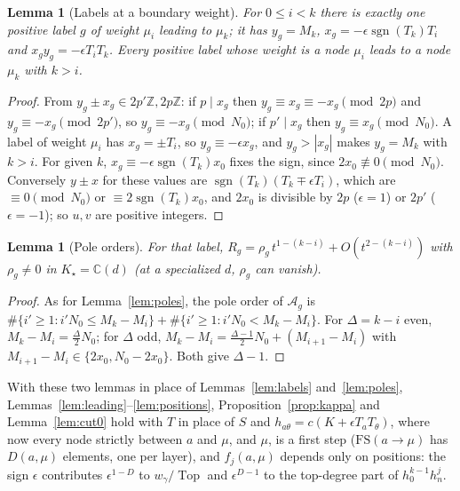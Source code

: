 \documentclass[11pt]{article}
\newtheorem{lemma}[theorem]{Lemma}
\theoremstyle{remark}
\begin{document}
\begin{lemma}[Labels at a boundary weight]\label{lem:blabels}
For $0\le i<k$ there is exactly one positive label $g$ of weight $\mu_i$
leading to $\mu_k$; it has $y_g=M_k$, $x_g=-\epsilon\operatorname{sgn}(T_k)T_i$
and $x_gy_g=-\epsilon T_iT_k$.  Every positive label whose weight is a node
$\mu_i$ leads to a node $\mu_k$ with $k>i$.
\end{lemma}

\begin{proof}
From $y_g\pm x_g\in2p'\mathbb Z,2p\mathbb Z$: if $p\mid x_g$ then
$y_g\equiv x_g\equiv-x_g\pmod{2p}$ and $y_g\equiv-x_g\pmod{2p'}$, so
$y_g\equiv-x_g\pmod{N_0}$; if $p'\mid x_g$ then $y_g\equiv x_g\pmod{N_0}$.  A
label of weight $\mu_i$ has $x_g=\pm T_i$, so $y_g\equiv-\epsilon x_g$, and
$y_g>|x_g|$ makes $y_g=M_k$ with $k>i$.  For given $k$, $x_g\equiv
-\epsilon\operatorname{sgn}(T_k)x_0$ fixes the sign, since $2x_0\not\equiv0\pmod{N_0}$.
Conversely $y\pm x$ for these values are
$\operatorname{sgn}(T_k)(T_k\mp\epsilon T_i)$, which are $\equiv0\pmod{N_0}$ or
$\equiv2\operatorname{sgn}(T_k)x_0$, and $2x_0$ is divisible by $2p$
($\epsilon=1$) or $2p'$ ($\epsilon=-1$); so $u,v$ are positive integers.
\end{proof}

\begin{lemma}[Pole orders]\label{lem:bpoles}
For that label, $R_g=\rho_g\,t^{1-(k-i)}+O(t^{2-(k-i)})$ with $\rho_g\neq0$ in
$K_\star=\mathbb C(d)$ (at a specialized $d$, $\rho_g$ can vanish).
\end{lemma}

\begin{proof}
As for Lemma~\ref{lem:poles}, the pole order of $\mathcal A_g$ is
$\#\{i'\ge1:i'N_0\le M_k-M_i\}+\#\{i'\ge1:i'N_0<M_k-M_i\}$.  For $\Delta=k-i$
even, $M_k-M_i=\frac\Delta2N_0$; for $\Delta$ odd,
$M_k-M_i=\frac{\Delta-1}2N_0+(M_{i+1}-M_i)$ with $M_{i+1}-M_i\in\{2x_0,N_0-2x_0\}$.
Both give $\Delta-1$.
\end{proof}

With these two lemmas in place of Lemmas~\ref{lem:labels} and~\ref{lem:poles},
Lemmas~\ref{lem:leading}--\ref{lem:positions}, Proposition~\ref{prop:kappa} and
Lemma~\ref{lem:cut0} hold with $T$ in place of $S$ and $h_{a\theta}=c(K+\epsilon
T_aT_\theta)$, where now every node strictly between $a$ and $\mu$, and $\mu$,
is a first step ($\mathrm{FS}(a\to\mu)$ has $D(a,\mu)$ elements, one per
layer), and $f_j(a,\mu)$ depends only on positions: the sign $\epsilon$
contributes $\epsilon^{1-D}$ to $w_\gamma/\operatorname{Top}$ and $\epsilon^{D-1}$
to the top-degree part of $h_0^{k-1}h_n^j$.
\end{document}
